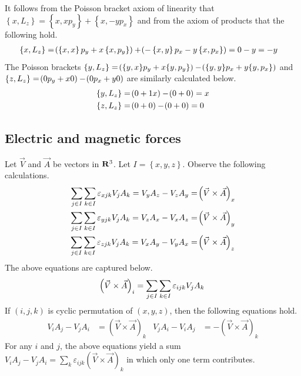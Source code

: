 \begin{answer}
	It follows from the Poisson bracket axiom of linearity that $\left\{x, L_z\right\} = \left\{x, x p_y\right\} + \left\{x, - y p_x \right\}$ and from the axiom of products that the following hold.
	\begin{align}
		\left\{x, L_z\right\} & = \!\left(\left\{x, x\right\} p_y  + x \left\{x, p_y\right\}\right) + \!\left(-\left\{x, y\right\}p_x - y \left\{x, p_x\right\}\right) = 0 - y = - y
	\end{align}
	The Poisson brackets $\left\{y, L_z\right\} = \!\left(\{y, x\} p_y + x \{y, p_y\}\right) - \!\left( \{y, y\} p_x + y \{y, p_x\}\right)$ and $\left\{z, L_z\right\} = \!\left(0 p_y + x 0\right) - \!\left(0 p_x + y 0\right)$ are similarly calculated below.
	\begin{align*}
		\left\{y, L_z\right\} & = \!\left(0 + 1 x\right) - \!\left(0 + 0\right) = x \\
		\left\{z, L_z\right\} & = \!\left(0 + 0\right) - \!\left(0 + 0\right) = 0
	\end{align*}
\end{answer}

\subsection{Electric and magnetic forces}

\begin{answer}
	Let $\vec{V}$ and $\vec{A}$ be vectors in $\mathbf{R}^3$.
	Let $I = \left\{x, y, z\right\}$.
	Observe the following calculations.
	\begin{align*}
		\sum_{j \in I} \sum_{k \in I} \varepsilon_{xjk} V_j A_k = V_y A_z - V_z A_y & = \!\left(\vec{V} \times \vec{A}\right)_x \\
		\sum_{j \in I} \sum_{k \in I} \varepsilon_{yjk} V_j A_k = V_z A_x - V_x A_z & = \!\left(\vec{V} \times \vec{A}\right)_y \\
		\sum_{j \in I} \sum_{k \in I} \varepsilon_{zjk} V_j A_k = V_x A_y - V_y A_x & = \!\left(\vec{V} \times \vec{A}\right)_z
	\end{align*}
	The above equations are captured below.
	\begin{align*}
		\!\left(\vec{V} \times \vec{A}\right)_i & = \sum_{j \in I} \sum_{k \in I} \varepsilon_{ijk} V_j A_k \\
	\end{align*}
	If $\left(i, j, k\right)$ is cyclic permutation of $\left(x, y, z\right)$, then the following equations hold.
	\begin{align*}
		V_i A_j - V_j A_i & = \left(\vec{V} \times \vec{A}\right)_k
		                  &
		V_j A_i - V_i A_j & = - \left(\vec{V} \times \vec{A}\right)_k
	\end{align*}
	For any $i$ and $j$, the above equations yield a sum $V_i A_j - V_j A_i = \sum_k \varepsilon_{ijk} \left(\vec{V} \times \vec{A}\right)_k$ in which only one term contributes.
\end{answer}

